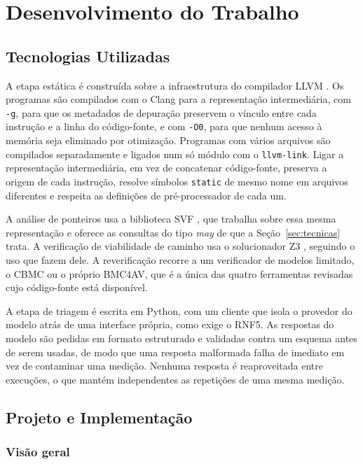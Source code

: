 \chapter{Desenvolvimento do Trabalho} \label{cap:desenvolvimento}

\section{Tecnologias Utilizadas}
\label{sec:tecnologias}

A etapa estática é construída sobre a infraestrutura do compilador LLVM
\cite{llvm}. Os programas são compilados com o Clang para a representação
intermediária, com \texttt{-g}, para que os metadados de depuração preservem o
vínculo entre cada instrução e a linha do código-fonte, e com \texttt{-O0},
para que nenhum acesso à memória seja eliminado por otimização. Programas com
vários arquivos são compilados separadamente e ligados num só módulo com o
\texttt{llvm-link}. Ligar a representação intermediária, em vez de concatenar
código-fonte, preserva a origem de cada instrução, resolve símbolos
\texttt{static} de mesmo nome em arquivos diferentes e respeita as definições
de pré-processador de cada um.

A análise de ponteiros usa a biblioteca SVF \cite{svf}, que trabalha sobre essa
mesma representação e oferece as consultas do tipo \textit{may} de que a
Seção~\ref{sec:tecnicas} trata. A verificação de viabilidade de caminho usa o
solucionador Z3 \cite{z3}, seguindo o uso que  fazem dele.
A reverificação recorre a um verificador de modelos limitado, o CBMC
\cite{cbmc} ou o próprio BMC4AV, que é a única das quatro ferramentas revisadas
cujo código-fonte está disponível.

A etapa de triagem é escrita em Python, com um cliente que isola o provedor do
modelo atrás de uma interface própria, como exige o RNF5. As respostas do
modelo são pedidas em formato estruturado e validadas contra um esquema antes
de serem usadas, de modo que uma resposta malformada falha de imediato em vez
de contaminar uma medição. Nenhuma resposta é reaproveitada entre execuções, o
que mantém independentes as repetições de uma mesma medição.

\section{Projeto e Implementação}
\label{sec:projeto}

\subsection{Visão geral}

